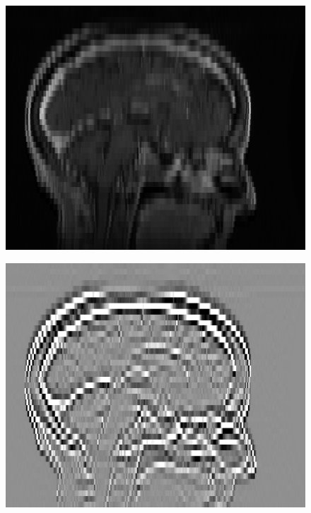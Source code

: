 \documentclass[fleqn,a4paper,oneside,openany]{book}
\begin{document}
\begin{figure}
\begin{minipage}[b]{140pt}
     \label{fig:radiomics_filter_5mm_original}
     \hspace{100pt}
   \end{minipage}
   \begin{minipage}[b]{140pt}
     \centering
     \includegraphics[trim = 0 0 0 0, clip, scale=0.38]{radiomics_filtering/filtered_image_5mm_spacing_lo.png}
     \label{fig:radiomics_filter_5mm_low_pass}
     \hspace{100pt}
   \end{minipage}
   \begin{minipage}[b]{140pt}
     \centering
     \includegraphics[trim = 0 0 0 0, clip, scale=0.38]{radiomics_filtering/filtered_image_5mm_spacing_hi.png}

\end{minipage}
\end{figure}
\end{document}
